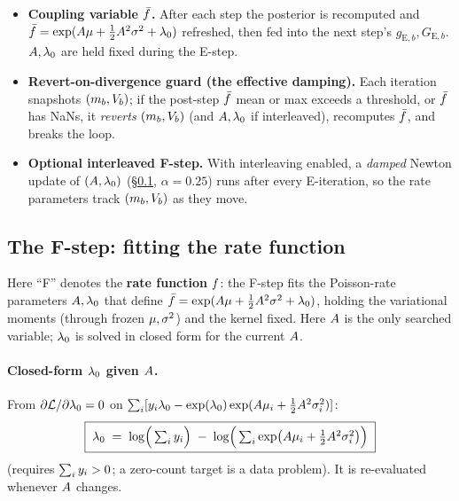 \begin{itemize}[leftmargin=1.4em,itemsep=1pt]
  \item \textbf{Coupling variable $\bar{f}$.} After each step the posterior is
        recomputed and $\bar{f}=\exp(A\mu+\tfrac12A^2\sigma^{2}+\lambda_{0})$
        refreshed, then fed into the next step's $g_{\mathrm E,b},G_{\mathrm E,b}$.
        $A,\lambda_{0}$ are held fixed during the E-step.
  \item \textbf{Revert-on-divergence guard (the effective damping).} Each iteration
        snapshots $(m_{b},V_{b})$; if the post-step $\bar{f}$ mean or max exceeds a
        threshold, or $\bar{f}$ has NaNs, it \emph{reverts} $(m_{b},V_{b})$ (and
        $A,\lambda_{0}$ if interleaved), recomputes $\bar{f}$, and breaks the loop.
  \item \textbf{Optional interleaved F-step.} With interleaving enabled, a
        \emph{damped} Newton update of $(A,\lambda_{0})$ (\S\ref{subsec:fstep},
        $\alpha=0.25$) runs after every E-iteration, so the rate parameters
        track $(m_{b},V_{b})$ as they move.
\end{itemize}

\subsection{The F-step: fitting the rate function}
\label{subsec:fstep}

Here ``F'' denotes the \textbf{rate function} $f$: the F-step fits the
Poisson-rate parameters $A,\lambda_{0}$ that define
$\bar{f}=\exp(A\mu+\tfrac12A^2\sigma^{2}+\lambda_{0})$, holding the variational
moments (through frozen $\mu,\sigma^{2}$) and the kernel fixed. Here $A$ is the
only searched variable; $\lambda_{0}$ is solved in closed form for the current $A$.

\paragraph{Closed-form $\lambda_{0}$ given $A$.}
From $\partial\mathcal{L}/\partial\lambda_{0}=0$ on
$\sum_i[y_i\lambda_{0}-\exp(\lambda_{0})\exp(A\mu_i+\tfrac12A^2\sigma^{2}_i)]$:
\begin{equation}
\boxed{\;
\lambda_{0} \;=\; \log\!\Big(\textstyle\sum_iy_i\Big)
       \;-\; \log\!\Big(\textstyle\sum_i\exp\!\big(A\mu_i+\tfrac12A^2\sigma^{2}_i\big)\Big)
\;}
\label{eq:fstep}
\end{equation}
(requires $\sum_iy_i>0$; a zero-count target is a data problem). It is
re-evaluated whenever $A$ changes.

